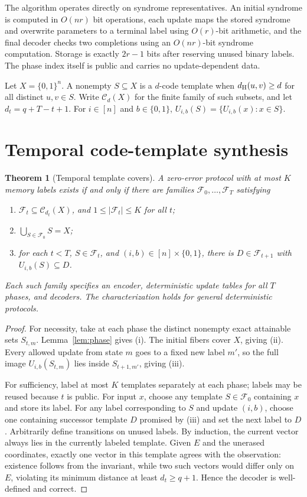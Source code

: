 \documentclass[11pt,a4paper]{article}
\newtheorem{theorem}{Theorem}[section]
\begin{document}
The algorithm operates directly on syndrome representatives. An initial syndrome is computed in $O(nr)$ bit operations, each update maps the stored syndrome and overwrite parameters to a terminal label using $O(r)$-bit arithmetic, and the final decoder checks two completions using an $O(nr)$-bit syndrome computation. Storage is exactly $2r-1$ bits after reserving unused binary labels. The phase index itself is public and carries no update-dependent data.


Let $X=\{0,1\}^n$. A nonempty $S\subseteq X$ is a $d$-code template when $d_{\rm H}(u,v)\ge d$ for all distinct $u,v\in S$. Write $\mathcal C_d(X)$ for the finite family of such subsets, and let $d_t=q+T-t+1$. For $i\in[n]$ and $b\in\{0,1\}$, $U_{i,b}(S)=\{U_{i,b}(x):x\in S\}$.
\section{Temporal code-template synthesis}\label{sec:template}
\begin{theorem}[Temporal template covers]\label{thm:cover}
A zero-error protocol with at most $K$ memory labels exists if and only if there are families $\mathcal F_0,\ldots,\mathcal F_T$ satisfying
\begin{enumerate}[label=(\roman*),leftmargin=2em]
\item $\mathcal F_t\subseteq\mathcal C_{d_t}(X)$, and $1\le|\mathcal F_t|\le K$ for all $t$;
\item $\bigcup_{S\in\mathcal F_0}S=X$;
\item for each $t<T$, $S\in\mathcal F_t$, and $(i,b)\in[n]\times\{0,1\}$, there is $D\in\mathcal F_{t+1}$ with $U_{i,b}(S)\subseteq D$.
\end{enumerate}
Each such family specifies an encoder, deterministic update tables for all $T$ phases, and decoders. The characterization holds for general deterministic protocols.
\end{theorem}
\begin{proof}
For necessity, take at each phase the distinct nonempty exact attainable sets $S_{t,m}$. Lemma~\ref{lem:phase} gives (i). The initial fibers cover $X$, giving (ii). Every allowed update from state $m$ goes to a fixed new label $m'$, so the full image $U_{i,b}(S_{t,m})$ lies inside $S_{t+1,m'}$, giving (iii).

For sufficiency, label at most $K$ templates separately at each phase; labels may be reused because $t$ is public. For input $x$, choose any template $S\in\mathcal F_0$ containing $x$ and store its label. For any label corresponding to $S$ and update $(i,b)$, choose one containing successor template $D$ promised by (iii) and set the next label to $D$. Arbitrarily define transitions on unused labels. By induction, the current vector always lies in the currently labeled template. Given $E$ and the unerased coordinates, exactly one vector in this template agrees with the observation: existence follows from the invariant, while two such vectors would differ only on $E$, violating its minimum distance at least $d_t\ge q+1$. Hence the decoder is well-defined and correct.
\end{proof}
\end{document}
